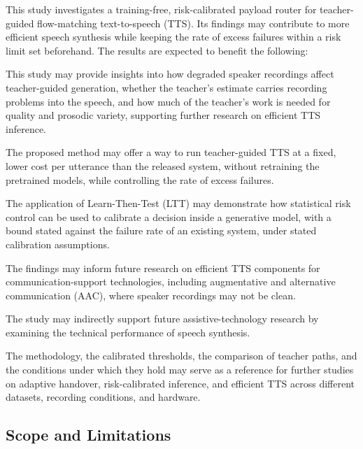 This study investigates a training-free, risk-calibrated payload router for teacher-guided flow-matching text-to-speech (TTS). Its findings may contribute to more efficient speech synthesis while keeping the rate of excess failures within a risk limit set beforehand. The results are expected to benefit the following:
\begin{description}[leftmargin=0pt,itemsep=2pt,font=\normalfont\itshape]
\item[TTS researchers.] This study may provide insights into how degraded speaker recordings affect teacher-guided generation, whether the teacher's estimate carries recording problems into the speech, and how much of the teacher's work is needed for quality and prosodic variety, supporting further research on efficient TTS inference.
\item[TTS developers.] The proposed method may offer a way to run teacher-guided TTS at a fixed, lower cost per utterance than the released system, without retraining the pretrained models, while controlling the rate of excess failures.
\item[Researchers in reliable machine learning.] The application of Learn-Then-Test (LTT) may demonstrate how statistical risk control can be used to calibrate a decision inside a generative model, with a bound stated against the failure rate of an existing system, under stated calibration assumptions.
\item[Assistive technology and AAC developers.] The findings may inform future research on efficient TTS components for communication-support technologies, including augmentative and alternative communication (AAC), where speaker recordings may not be clean.
\item[Autistic and neurodivergent learners.] The study may indirectly support future assistive-technology research by examining the technical performance of speech synthesis.
\item[Future researchers.] The methodology, the calibrated thresholds, the comparison of teacher paths, and the conditions under which they hold may serve as a reference for further studies on adaptive handover, risk-calibrated inference, and efficient TTS across different datasets, recording conditions, and hardware.
\end{description}

\subsection{Scope and Limitations}
\label{sec:scope}

